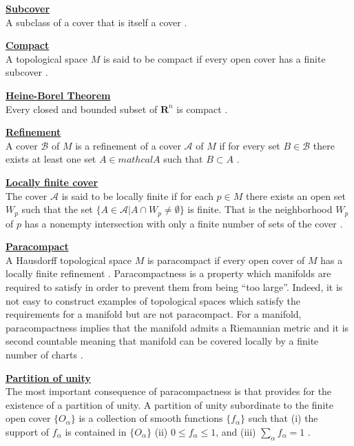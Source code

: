 \documentclass[twocolumn]{article}
\newenvironment{defit}[1]
  {\noindent{$\bullet$}\underline{\textbf{#1}}\\}
  {\\}
\begin{document}
\begin{defit}{Subcover}
A subclass of a cover that is itself a cover 
\cite{love_rund}.
\end{defit}

\begin{defit}{Compact}
A topological space $M$ is said to be compact if every open
cover has a finite subcover \cite{love_rund}.
\end{defit}

\begin{defit}{Heine-Borel Theorem}
Every closed and bounded subset of $\mathbf{R}^{n}$ is compact 
\cite{love_rund}.
\end{defit}

\begin{defit}{Refinement}
A cover $\mathcal{B}$ of $M$ is a refinement of a cover 
$\mathcal{A}$ of $M$ if for every set $B \in \mathcal{B}$ there exists 
at least one set $A \in mathcal{A}$ such that $B \subset A$ 
\cite{love_rund}.
\end{defit}

\begin{defit}{Locally finite cover}
The cover $\mathcal{A}$ is said to be locally 
finite if for each $p \in M$ there exists an open set $W_p$ such that 
the set $\{ A \in \mathcal{A} | A \cap W_{p} \neq \emptyset \}$ is 
finite.  That is the neighborhood $W_p$ of $p$ has a nonempty 
intersection with only a finite number of sets of the cover  
\cite{love_rund}.
\end{defit}

\begin{defit}{Paracompact}
A Hausdorff topological space $M$ is paracompact 
if every open cover of $M$ has a locally finite refinement 
\cite{love_rund}. 
Paracompactness is a property which manifolds are required to satisfy 
in order to prevent them from being ``too large''.  Indeed, it is not 
easy to construct examples of topological spaces which satisfy the 
requirements for a manifold but are not paracompact.  For a manifold, 
paracompactness implies that the manifold admits a Riemannian metric 
and it is second countable meaning that manifold can be covered 
locally by a finite number of charts \cite{wald}.  
\end{defit}

\begin{defit}{Partition of unity}
The most important consequence of paracompactness 
is that provides for the existence of a partition of unity.  A 
partition of unity subordinate to the finite open cover 
$\{O_{\alpha}\}$ is a collection of smooth functions 
$\{ f_{\alpha} \}$ such that (i) the support of $f_{\alpha}$
is contained in $\{O_{\alpha}\}$ (ii) $0 \leq f_{\alpha} \leq 1$, 
and (iii) $\sum_{\alpha} f_{\alpha} = 1$ \cite{wald}.
\end{defit}
\end{document}
